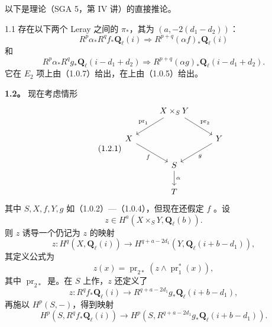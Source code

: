 以下是理论（SGA 5，第 IV 讲）的直接推论。
\begin{SGAresult}{}{1.1}
存在以下两个 Leray 之间的 $\pi_*$，其为 $(a,-2(d_1-d_2))$：
\begin{equation}\tag{1.1.0}
R^p\alpha_*R^qf_*\mathbf Q_\ell(i)\Longrightarrow R^{p+q}(\alpha f)_*\mathbf Q_\ell(i)
\end{equation}
和
\begin{equation}\tag{1.1.1}
R^p\alpha_*R^qg_*\mathbf Q_\ell(i-d_1+d_2)\Longrightarrow R^{p+q}(\alpha g)_*\mathbf Q_\ell(i-d_1+d_2).
\end{equation}
它在 $E_2$ 项上由（1.0.7）给出，在上由（1.0.5）给出。
\end{SGAresult}
\textbf{1.2。} 现在考虑情形
\begin{equation}\tag{1.2.1}
\begin{tikzcd}
& X\times_S Y \arrow[dl,"\operatorname{pr}_1"'] \arrow[dr,"\operatorname{pr}_2"] &\\
X \arrow[dr,"f"'] && Y \arrow[dl,"g"]\\
& S \arrow[d,"\alpha"] &\\
& T &
\end{tikzcd}
\end{equation}
其中 $S,X,f,Y,g$ 如（1.0.2）—（1.0.4），但现在还假定 $f$ 。设
\begin{equation}\tag{1.2.2}
z\in H^a(X\times_S Y,\mathbf Q_\ell(b)).
\end{equation}
则 $z$ 诱导一个仍记为 $z$ 的映射
\begin{equation}\tag{1.2.3}
z:H^q(X,\mathbf Q_\ell(i))\longrightarrow H^{q+a-2d_1}(Y,\mathbf Q_\ell(i+b-d_1)),
\end{equation}
其定义公式为
\begin{equation}\tag{1.2.4}
z(x)=\operatorname{pr}_{2*}(z\wedge\operatorname{pr}_1^*(x)),
\end{equation}
其中 $\operatorname{pr}_{2*}$ 是。在 $S$ 上作，$z$ 还定义了
\begin{equation}\tag{1.2.5}
z:R^qf_*\mathbf Q_\ell(i)\longrightarrow R^{q+a-2d_1}g_*\mathbf Q_\ell(i+b-d_1),
\end{equation}
再施以 $H^p(S,-)$，得到映射
\begin{equation}\tag{1.2.6}
H^p(S,R^qf_*\mathbf Q_\ell(i))\longrightarrow H^p(S,R^{q+a-2d_1}g_*\mathbf Q_\ell(i+b-d_1)).
\end{equation}
